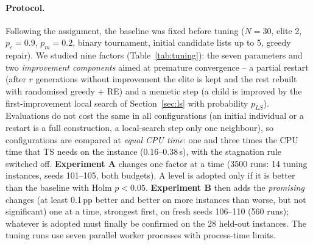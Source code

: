 \documentclass[11pt,a4paper]{article}
\begin{document}
\paragraph{Protocol.} Following the assignment, the baseline was fixed before tuning ($N=30$, elite 2, $p_c=0.9$, $p_m=0.2$, binary tournament, initial candidate lists up to 5, greedy repair).
We studied nine factors (Table~\ref{tab:tuning}): the seven parameters and two \emph{improvement components} aimed at premature convergence -- a partial restart (after $r$ generations without improvement the elite is kept and the rest rebuilt with randomised greedy + RE) and a memetic step (a child is improved by the first-improvement local search of Section~\ref{sec:ls} with probability $p_{LS}$).
Evaluations do not cost the same in all configurations (an initial individual or a restart is a full construction, a local-search step only one neighbour), so configurations are compared at \emph{equal CPU time}: one and three times the CPU time that TS needs on the instance (0.16--0.38\,s), with the stagnation rule switched off.
\textbf{Experiment A} changes one factor at a time (3500 runs: 14 tuning instances, seeds 101--105, both budgets). A level is adopted only if it is better than the baseline with Holm $p<0.05$.
\textbf{Experiment B} then adds the \emph{promising} changes (at least 0.1\,pp better and better on more instances than worse, but not significant) one at a time, strongest first, on fresh seeds 106--110 (560 runs); whatever is adopted must finally be confirmed on the 28 held-out instances.
The tuning runs use seven parallel worker processes with process-time limits.


\end{document}
